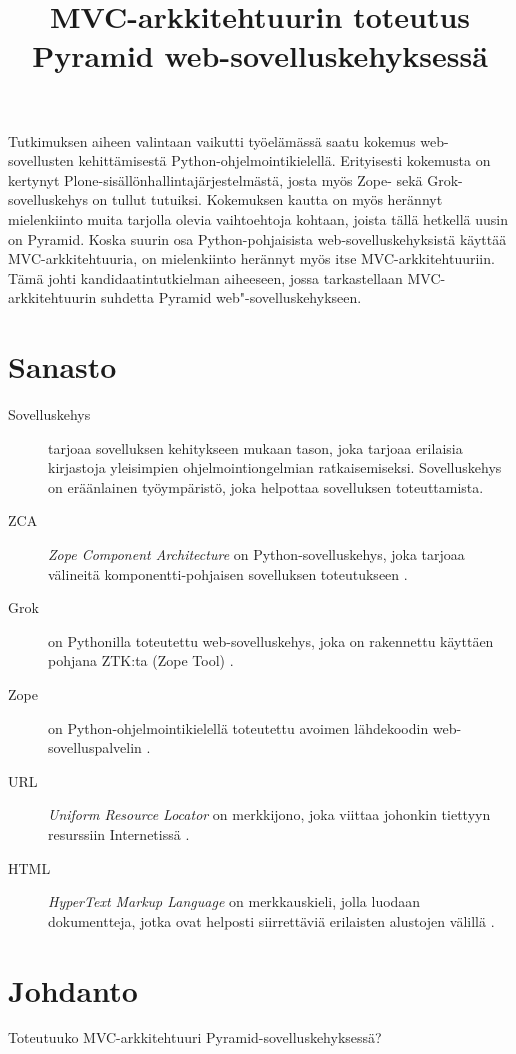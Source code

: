 \documentclass[finnish,utf8,nonumbib,palatino,kandi]{gradu2}
\title{MVC-arkkitehtuurin toteutus Pyramid web-sovelluskehyksessä}
\begin{document}
\preface

Tutkimuksen aiheen valintaan vaikutti työelämässä saatu
 kokemus web-sovellusten kehittämisestä Python-ohjelmointikielellä. Erityisesti
kokemusta on kertynyt Plone-sisällönhallintajärjestelmästä, josta myös Zope- sekä
Grok-sovelluskehys on tullut tutuiksi. Kokemuksen kautta on myös herännyt mielenkiinto
muita tarjolla olevia vaihtoehtoja kohtaan, joista tällä hetkellä uusin on Pyramid. Koska suurin osa Python-pohjaisista
web-sovelluskehyksistä käyttää MVC-arkkitehtuuria, on mielenkiinto herännyt myös itse MVC-arkkitehtuuriin. Tämä johti
kandidaatintutkielman aiheeseen, jossa tarkastellaan MVC-arkkitehtuurin suhdetta Pyramid web"-sovelluskehykseen.

\section{Sanasto}
\begin{description}
    \item[Sovelluskehys] tarjoaa sovelluksen kehitykseen mukaan tason, joka tarjoaa erilaisia kirjastoja yleisimpien ohjelmointiongelmian ratkaisemiseksi. Sovelluskehys on eräänlainen työympäristö, joka helpottaa sovelluksen toteuttamista.
    \item[ZCA] \emph{Zope Component Architecture} on Python-sovelluskehys, joka tarjoaa välineitä komponentti-pohjaisen sovelluksen toteutukseen \cite{ZCA}. 
    \item[Grok] on Pythonilla toteutettu web-sovelluskehys, joka on rakennettu käyttäen pohjana ZTK:ta (Zope Tool) \cite{grok}.
    \item[Zope] on Python-ohjelmointikielellä toteutettu avoimen lähdekoodin web-sovelluspalvelin \cite{zope}.   
    \item[URL] \emph{Uniform Resource Locator} on merkkijono, joka viittaa johonkin tiettyyn resurssiin Internetissä \cite{URL}.
    \item[HTML] \emph{HyperText Markup Language} on merkkauskieli, jolla luodaan dokumentteja, jotka ovat helposti siirrettäviä erilaisten alustojen välillä \cite{HTML}.
\end{description}

\mainmatter
\section{Johdanto}
Toteutuuko MVC-arkkitehtuuri Pyramid-sovelluskehyksessä?
\end{document}
